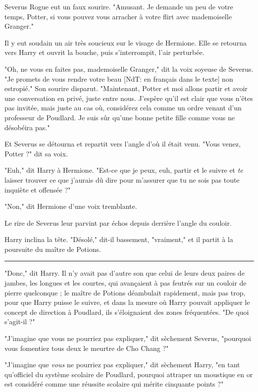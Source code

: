 Severus Rogue eut un faux sourire. "Amusant. Je demande un peu de votre temps, Potter, si vous pouvez vous arracher à votre flirt avec mademoiselle Granger."

Il y eut soudain un air très soucieux sur le visage de Hermione. Elle se retourna vers Harry et ouvrit la bouche, puis s'interrompit, l'air perturbée.

"Oh, ne vous en faites pas, mademoiselle Granger," dit la voix soyeuse de Severus. "Je promets de vous rendre votre beau [NdT: en français dans le texte] non estropié." Son sourire disparut. "Maintenant, Potter et moi allons partir et avoir une conversation en privé, juste entre nous. J'espère qu'il est clair que vous n'êtes pas invitée, mais juste au cas où, considérez cela comme un ordre venant d'un professeur de Poudlard. Je suis sûr qu'une bonne petite fille comme vous ne désobéira pas."

Et Severus se détourna et repartit vers l'angle d'où il était venu. "Vous venez, Potter ?" dit sa voix.

"Euh," dit Harry à Hermione. "Est-ce que je peux, euh, partir et le suivre et \emph{te}  laisser trouver ce que j'aurais dû dire pour m'assurer que tu ne sois pas toute inquiète et offensée ?"

"Non," dit Hermione d'une voix tremblante.

Le rire de Severus leur parvint par échos depuis derrière l'angle du couloir.

Harry inclina la tête. "Désolé," dit-il bassement, "vraiment," et il partit à la poursuite du maître de Potions.
\par\noindent\rule{\textwidth}{0.4pt}
"Donc," dit Harry. Il n'y avait pas d'autre son que celui de leurs deux paires de jambes, les longues et les courtes, qui avançaient à pas feutrés sur un couloir de pierre quelconque ; le maître de Potions déambulait rapidement, mais pas trop, pour que Harry puisse le suivre, et dans la mesure où Harry pouvait appliquer le concept de direction à Poudlard, ils s'éloignaient des zones fréquentées. "De quoi s'agit-il ?"

"J'imagine que vous ne pourriez pas expliquer," dit sèchement Severus, "pourquoi vous fomentiez tous deux le meurtre de Cho Chang ?"

"J'imagine que \emph{vous}  ne pourriez pas expliquer," dit sèchement Harry, "en tant qu'officiel du système scolaire de Poudlard, pourquoi attraper un moustique en or est considéré comme une réussite scolaire qui mérite cinquante points ?"

